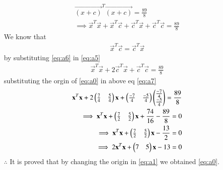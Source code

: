 \documentclass[journal,12pt,twocolumn]{IEEEtran}
\begin{document}
\begin{align}
\vec{(x+c)}^T\vec{(x+c)} = \frac{89}{8}\\
\implies \vec{x}^T\vec{x}+\vec{x}^T\vec{c}+\vec{c}^T\vec{x}+\vec{c}^T\vec{c} = \frac{89}{8}
\label{eq:a5}
\end{align}
We know that
\begin{align}
\vec{x}^T\vec{c} = \vec{c}^T\vec{x}
\label{eq:a6}
\end{align}
by substituting \eqref{eq:a6} in \eqref{eq:a5}
\begin{align}
\vec{x}^T\vec{x}+2\vec{c}^T\vec{x}+\vec{c}^T\vec{c} = \frac{89}{8}
\label{eq:a7}
\end{align}
substituting the orgin of \eqref{eq:a0} in above eq \eqref{eq:a7}
\begin{align}
\mathbf{x}^T\mathbf{x}+2\begin{pmatrix}\frac{7}{4}&\frac{5}{4}\end{pmatrix}\mathbf{x}+\begin{pmatrix}\frac{-7}{4}&\frac{-5}{4}\end{pmatrix}\begin{pmatrix}\frac{-7}{4}\\\frac{-5}{4}\end{pmatrix} = \frac{89}{8}\\
\implies \mathbf{x}^T\mathbf{x}+\begin{pmatrix}\frac{7}{2}&\frac{5}{2}\end{pmatrix}\mathbf{x}+\frac{74}{16}-\frac{89}{8} = 0\\
\implies \mathbf{x}^T\mathbf{x}+\begin{pmatrix}\frac{7}{2}&\frac{5}{2}\end{pmatrix}\mathbf{x}-\frac{13}{2} = 0\\
\implies 2\mathbf{x}^T\mathbf{x}+\begin{pmatrix}7&5\end{pmatrix}\mathbf{x}-13 = 0
\end{align}
$\therefore$ It is proved that by changing the origin in \eqref{eq:a1} we obtained \eqref{eq:a0}.
\end{document}
